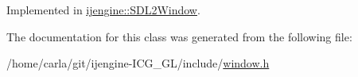 Implemented in \hyperlink{classijengine_1_1SDL2Window_a9ee858781f682de6e1f4e07e0e005d52}{ijengine\-::\-S\-D\-L2\-Window}.



The documentation for this class was generated from the following file\-:\begin{DoxyCompactItemize}
\item 
/home/carla/git/ijengine-\/\-I\-C\-G\-\_\-\-G\-L/include/\hyperlink{window_8h}{window.\-h}\end{DoxyCompactItemize}
